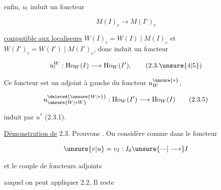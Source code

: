 enfin, $u_!$ induit un foncteur

\[
M(I)_c\longrightarrow M(I')_c\tag*{(2.3.3)}
\]

\uline{compatible aux localiseurs} $W(I)_c=W(I)\mid M(I)_c$
et $W(I')_c=W(I')\mid M(I')_c$, donc induit
un foncteur

\[
u_!^W:\mathrm{Ho}_W(I)\longrightarrow\mathrm{Ho}_W(I'),\tag*{(2.3.\unsure{4|5})}
\]

Ce foncteur est un adjoint à gauche du
foncteur $u_W^{\unsure{*}}$,

\[
u_{\unsure{W|*W}}^{\deleted{\unsure{W|*}}}:\mathrm{Ho}_W(I')\longrightarrow\mathrm{Ho}_W(I)\tag*{(2.3.5)}
\]

induit par $u^*$  (2.3.1).

\uline{Démonstration de} 2.3. Prouvons . On considère
comme dans  le foncteur

\[
\unsure{v|u}=v_I:I_0\unsure{\text{---}|\longrightarrow} I
\]

et le couple de foncteurs adjoints


auquel on peut appliquer 2.2,  Il reste
